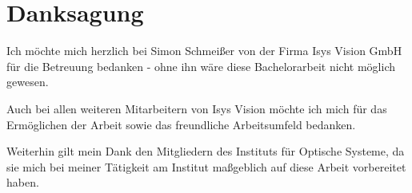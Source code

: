 \thispagestyle{plain}
\chapter*{Danksagung}
\label{ch:danksagung}

Ich möchte mich herzlich bei Simon Schmeißer von der Firma Isys Vision GmbH für die Betreuung bedanken - ohne ihn wäre diese Bachelorarbeit nicht möglich gewesen.

Auch bei allen weiteren Mitarbeitern von Isys Vision möchte ich mich für das Ermöglichen der Arbeit sowie das freundliche Arbeitsumfeld bedanken.

Weiterhin gilt mein Dank den Mitgliedern des Instituts für Optische Systeme, da sie mich bei meiner Tätigkeit am Institut maßgeblich auf diese Arbeit vorbereitet haben.